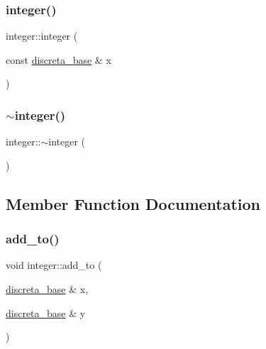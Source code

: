 \mbox{\label{classinteger_a37270fa45383a0798e3fd1e1330cb9a5}} 
\subsubsection{\texorpdfstring{integer()}{integer()}\hspace{0.1cm}{\footnotesize\ttfamily [4/4]}}
{\footnotesize\ttfamily integer\+::integer (\begin{DoxyParamCaption}\item[{const \mbox{\hyperlink{classdiscreta__base}{discreta\+\_\+base}} \&}]{x }\end{DoxyParamCaption})}

\mbox{\label{classinteger_a87b9f2b5aaf4ab5e5230b33d456e33d5}} 
\subsubsection{\texorpdfstring{$\sim$integer()}{~integer()}}
{\footnotesize\ttfamily integer\+::$\sim$integer (\begin{DoxyParamCaption}{ }\end{DoxyParamCaption})}



\subsection{Member Function Documentation}
\mbox{\label{classinteger_a3f6fe19fe4f2948364b1e75a6dfec47f}} 
\subsubsection{\texorpdfstring{add\+\_\+to()}{add\_to()}}
{\footnotesize\ttfamily void integer\+::add\+\_\+to (\begin{DoxyParamCaption}\item[{\mbox{\hyperlink{classdiscreta__base}{discreta\+\_\+base}} \&}]{x,  }\item[{\mbox{\hyperlink{classdiscreta__base}{discreta\+\_\+base}} \&}]{y }\end{DoxyParamCaption})\hspace{0.3cm}{\ttfamily [virtual]}}




